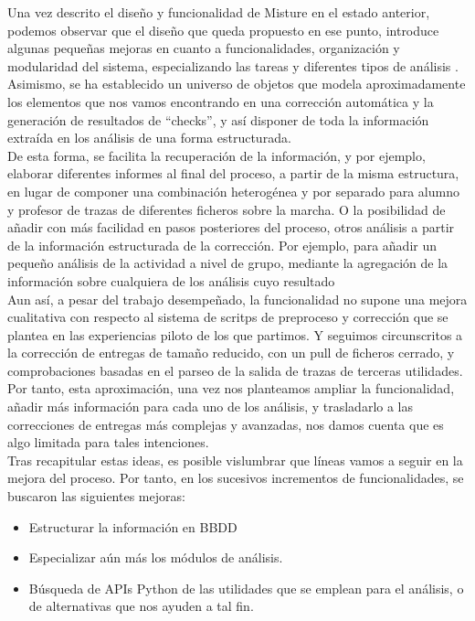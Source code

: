 Una vez descrito el diseño y funcionalidad de Misture en el estado anterior, podemos observar que el diseño que queda propuesto en ese punto, introduce algunas pequeñas mejoras en cuanto a funcionalidades, organización y modularidad del sistema, especializando las tareas y diferentes tipos de análisis .\\


Asimismo, se ha establecido un universo de objetos que modela aproximadamente los elementos que nos vamos encontrando en una corrección automática y la generación de resultados de ``checks'', y así disponer de toda la información extraída en los análisis de una forma estructurada.\\


De esta forma, se facilita la recuperación de la información, y por ejemplo, elaborar diferentes informes al final del proceso, a partir de la misma estructura, en lugar de componer  una combinación heterogénea y por separado para alumno y profesor de trazas de diferentes ficheros sobre la marcha. O la posibilidad de añadir con más facilidad en pasos posteriores del proceso, otros análisis a partir de la información estructurada de la corrección. Por ejemplo, para añadir un pequeño análisis de la actividad a nivel de grupo, mediante la agregación de la información sobre cualquiera de los análisis cuyo resultado\\


Aun así, a pesar del trabajo desempeñado, la funcionalidad no supone una mejora cualitativa con respecto al sistema de scritps de preproceso y corrección que se plantea en las experiencias piloto de los que partimos. Y seguimos circunscritos a la corrección de entregas de tamaño reducido, con un pull de ficheros cerrado, y comprobaciones basadas en el parseo de la salida de trazas de terceras utilidades.\\


Por tanto, esta aproximación, una vez nos planteamos ampliar la funcionalidad, añadir más información para cada uno de los análisis, y trasladarlo a las correcciones de entregas más complejas y avanzadas, nos damos cuenta que es algo limitada para tales intenciones.\\


Tras recapitular estas ideas, es posible vislumbrar que líneas vamos a seguir en la mejora del proceso. Por tanto, en los sucesivos incrementos de funcionalidades, se buscaron las siguientes mejoras:\\

\begin{itemize}
\item Estructurar la información en BBDD

\item Especializar aún más los módulos de análisis.

\item Búsqueda de APIs Python de las utilidades que se emplean para el análisis, o de alternativas que nos ayuden a tal fin.
\end{itemize}


